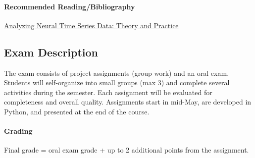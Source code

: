 \paragraph*{Recommended Reading/Bibliography}
\href{https://direct.mit.edu/books/monograph/4013/Analyzing-Neural-Time-Series-DataTheory-and}{Analyzing Neural Time Series Data: Theory and Practice}

\subsection*{Exam Description}
The exam consists of project assignments (group work) and an oral exam. Students will self-organize into small groups (max 3) and complete several activities during the semester. Each assignment will be evaluated for completeness and overall quality.  
Assignments start in mid-May, are developed in Python, and presented at the end of the course.

\paragraph*{Grading}
Final grade = oral exam grade + up to 2 additional points from the assignment.